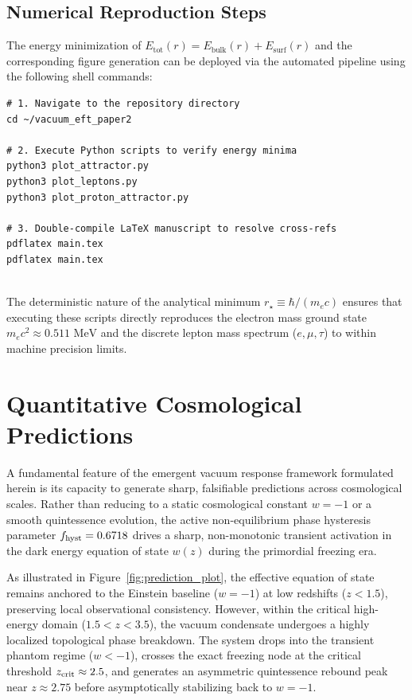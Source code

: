 \documentclass[
  reprint,
  aps,
  prd,
  twocolumn,
  superscriptaddress,
  nofootinbib,
  floatfix
]{revtex4-2}
\begin{document}
\subsection{Numerical Reproduction Steps}
\label{sec:reproduction_steps}

The energy minimization of $E_{\text{tot}}(r) = E_{\text{bulk}}(r)
+ E_{\text{surf}}(r)$ and the corresponding figure generation 
can be deployed via the automated pipeline using the following 
shell commands:

\begin{verbatim}
# 1. Navigate to the repository directory
cd ~/vacuum_eft_paper2

# 2. Execute Python scripts to verify energy minima
python3 plot_attractor.py
python3 plot_leptons.py
python3 plot_proton_attractor.py

# 3. Double-compile LaTeX manuscript to resolve cross-refs
pdflatex main.tex
pdflatex main.tex


\end{verbatim}

The deterministic nature of the analytical minimum $r_\star
\equiv \hbar/(m_e c)$ ensures that executing these scripts 
directly reproduces the electron mass ground state $m_e c^2
\approx 0.511 \text{ MeV}$ and the discrete lepton mass 
spectrum ($e, \mu, \tau$) to within machine precision limits.

\section{Quantitative Cosmological Predictions}
\label{sec:predictions}

A fundamental feature of the emergent vacuum response framework 
formulated herein is its capacity to generate sharp, falsifiable 
predictions across cosmological scales. Rather than reducing 
to a static cosmological constant $w = -1$ or a smooth 
quintessence evolution, the active non-equilibrium phase 
hysteresis parameter $f_{\rm hyst} = 0.6718$ drives a sharp, 
non-monotonic transient activation in the dark energy 
equation of state $w(z)$ during the primordial freezing era.

As illustrated in Figure~\ref{fig:prediction_plot}, the 
effective equation of state remains anchored to the 
Einstein baseline ($w = -1$) at low redshifts ($z < 1.5$), 
preserving local observational consistency. However, within the 
critical high-energy domain ($1.5 < z < 3.5$), the vacuum 
condensate undergoes a highly localized topological phase 
breakdown. The system drops into the transient phantom 
regime ($w < -1$), crosses the exact freezing node at the 
critical threshold $z_{\rm crit} \approx 2.5$, and generates 
an asymmetric quintessence rebound peak near $z \approx 2.75$ 
before asymptotically stabilizing back to $w = -1$.
\end{document}
